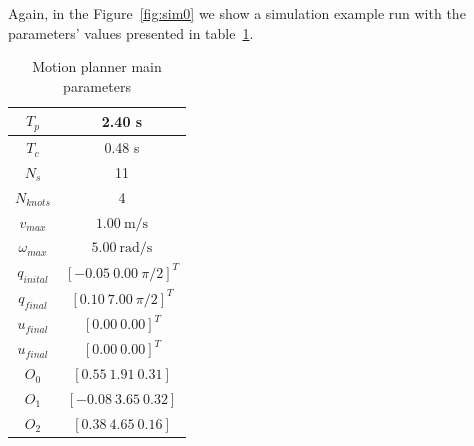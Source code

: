 Again, in the Figure~\ref{fig:sim0} we show a simulation example run with the parameters' values presented in table~\ref{tab:s3param}.

\begin{table}[!h]
\caption {Motion planner main parameters} \label{tab:s3param}
\begin{center}
\begin{tabular}{|c|c|}
\hline
$T_p$ & 2.40 s\\
\hline 
$T_c$ & 0.48 s\\
\hline 
$N_s$ & 11\\
\hline 
$N_{knots}$ & 4\\
\hline
$v_{max}$ & $1.00\ \mathrm{m/s}$\\
\hline
$\omega_{max}$ & $5.00\ \mathrm{rad/s}$\\
\hline
$q_{inital}$ & $[-0.05\ 0.00\ \pi/2]^T$\\
\hline
$q_{final}$ & $[0.10\ 7.00\ \pi/2]^T$\\
\hline
$u_{final}$ & $[0.00\ 0.00]^T$\\
\hline
$u_{final}$ & $[0.00\ 0.00]^T$\\
\hline
$O_0$ & $[0.55\ 1.91\ 0.31]$\\
\hline
$O_1$ & $[-0.08\ 3.65\ 0.32]$\\
\hline
$O_2$ & $[0.38\ 4.65\ 0.16]$\\
\hline
\end{tabular}
\end{center}
\end{table}

